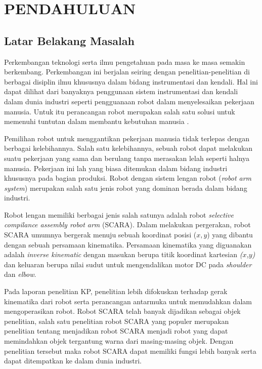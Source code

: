
\chapter{PENDAHULUAN}

\section{Latar Belakang Masalah}

	Perkembangan teknologi serta ilmu pengetahuan pada masa ke masa semakin berkembang. Perkembangan ini berjalan seiring dengan penelitian-penelitian di berbagai disiplin ilmu khususnya dalam bidang instrumentasi dan kendali. Hal ini dapat dilihat dari banyaknya penggunaan sistem instrumentasi dan kendali dalam dunia industri seperti pengguanaan robot dalam menyelesaikan pekerjaan manusia. Untuk itu perancangan robot merupakan salah satu solusi untuk memenuhi tuntutan dalam membantu kebutuhan manusia \cite{Faris2012}.
	
	Pemilihan robot untuk menggantikan pekerjaan manusia tidak terlepas dengan berbagai kelebihannya. Salah satu kelebihannya, sebuah robot dapat melakukan suatu pekerjaan yang sama dan berulang tanpa merasakan lelah seperti halnya manusia. Pekerjaan ini lah yang biasa ditemukan dalam bidang industri khususnya pada bagian produksi. Robot dengan sistem lengan robot (\emph {robot arm system}) merupakan salah satu jenis robot yang dominan berada dalam bidang industri\cite{Bimantaka2014}. 
	
	Robot lengan memiliki berbagai jenis salah satunya adalah robot \emph{selective compilance assembly robot arm} (SCARA). Dalam melakukan pergerakan, robot SCARA umumnya bergerak menuju sebuah koordinat posisi ($x, y$) yang dibantu dengan sebuah persamaan kinematika. Persamaan kinematika yang diguanakan adalah \textit{inverse kinematic} dengan masukan berupa titik koordinat kartesian \textit{($x$,$y$)} dan keluaran berupa nilai sudut untuk mengendalikan motor DC pada \textit{shoulder} dan \textit{elbow}.
	
	Pada laporan penelitian KP, penelitian lebih difokuskan terhadap gerak kinematika dari robot serta perancangan antarmuka untuk memudahkan dalam mengoperasikan robot. Robot SCARA telah banyak dijadikan sebagai objek penelitian, salah satu penelitian robot SCARA yang populer merupakan penelitian tentang menjadikan robot SCARA menjadi robot yang dapat memindahkan objek tergantung warna dari masing-masing objek. Dengan penelitian tersebut maka robot SCARA dapat memiliki fungsi lebih banyak serta dapat ditempatkan ke dalam dunia industri.
	
